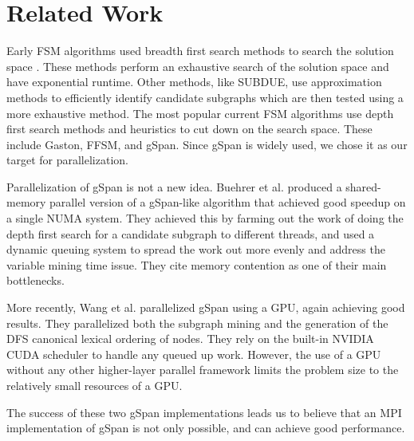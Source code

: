 \section{Related Work}
\label{sec:related}

Early FSM algorithms used breadth first search methods to search the
solution space \cite{AGM}\cite{FSG}.  These methods perform an exhaustive
search of the solution space and have exponential runtime.  Other methods, 
like SUBDUE\cite{subdue}, use approximation methods to efficiently 
identify candidate subgraphs which are then tested using a more exhaustive
method. The most popular current FSM algorithms use depth first search 
methods and heuristics to cut down on the search space. These include
Gaston\cite{gaston}, FFSM\cite{ffsm}, and gSpan\cite{gspan}.  Since
gSpan is widely used, we chose it as our target for parallelization.

Parallelization of gSpan is not a new idea. 
Buehrer et al. produced a shared-memory
parallel version of a gSpan-like algorithm that achieved good speedup on a 
single NUMA system\cite{buehrer2005parallel}.  They achieved this by 
farming out the work of doing the depth first search for a candidate 
subgraph to different threads, and used a dynamic queuing 
system to spread the work out more evenly and address the variable
mining time issue.  They cite memory contention as one of their main 
bottlenecks.

More recently, Wang et al. parallelized gSpan using a 
GPU\cite{gspancuda}, again achieving good results.  They parallelized both
the subgraph mining and the generation of the DFS canonical lexical 
ordering of nodes.  They rely on the built-in NVIDIA CUDA scheduler to handle
any queued up work. However, the use of a GPU without any other higher-layer 
parallel framework limits the problem size to the relatively small resources 
of a GPU. 

The success of these two gSpan implementations leads us to believe that an
MPI implementation of gSpan is not only possible, and can achieve good 
performance.
